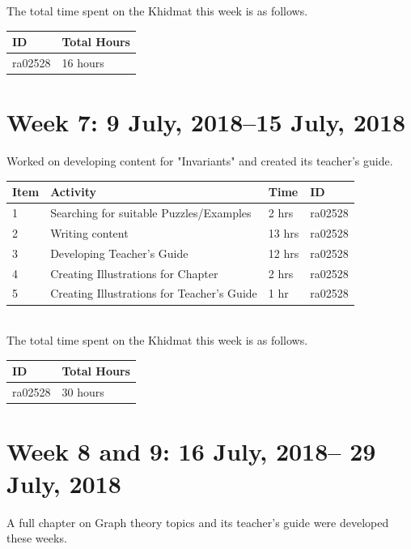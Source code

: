 \documentclass{article}
\begin{document}
The total time spent on the Khidmat this week is as follows.

\begin{tabular}{|l|l|}
  \hline
  ID & Total Hours\\\hline\hline
  ra02528 & 16 hours\\\hline
\end{tabular}

\newpage %

\section*{Week 7: 9 July, 2018--15 July, 2018}
Worked on developing content for "Invariants" and created its teacher's guide.\\


\begin{tabular}{|l|l|l|l|}
  \hline
  Item 	& Activity & Time & ID \\\hline\hline
  1	& Searching for suitable Puzzles/Examples & 2 hrs & ra02528 \\\hline
  2	& Writing content & 13 hrs & ra02528 \\\hline
  3	& Developing Teacher's Guide & 12 hrs & ra02528 \\\hline
  4	& Creating Illustrations for Chapter &  2 hrs & ra02528 \\\hline
  5	& Creating Illustrations for Teacher's Guide & 1 hr & ra02528 \\\hline
\end{tabular}\\

The total time spent on the Khidmat this week is as follows.

\begin{tabular}{|l|l|}
  \hline
  ID & Total Hours\\\hline\hline
  ra02528 & 30 hours\\\hline
\end{tabular}


\newpage %

\section*{Week 8 and 9: 16 July, 2018-- 29 July, 2018}
A full chapter on Graph theory topics and its teacher's guide were developed these weeks.\\
\end{document}

